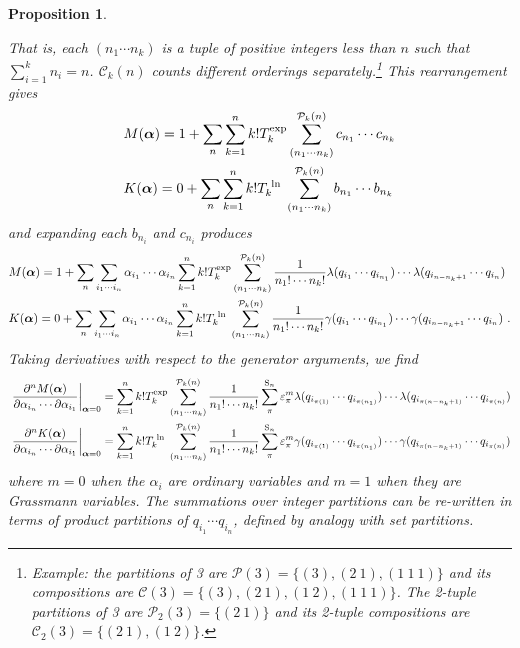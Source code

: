 \documentclass[11pt,fleqn]{article}
\renewcommand{\a}{\alpha}    %
\newcommand{\g}{\gamma}      %
\newcommand{\e}{\varepsilon} %
\newcommand{\la}{\lambda}    %
\newcommand{\cd}{\ensuremath{\cdots}}
\newcommand{\mc}[1]{\ensuremath{\mathcal{#1}}}
\newcommand{\mr}[1]{\ensuremath{\mathrm{#1}}}
\newcommand{\fr}[2]{\ensuremath{\dfrac{#1}{#2}}}
\newcommand{\pd}[2]{\ensuremath{\frac{\partial#1}{\partial#2}}}
\newcommand{\pt}{\ensuremath{\partial}}
\theoremstyle{mystyle}
\newtheorem{pro}{Proposition}[section]
\newcommand{\logbox}{\ensuremath{\text{\makebox[\widthof{exp}][c]{ln}}}}
\newcommand{\expbox}{\ensuremath{\text{\makebox[\widthof{exp}][c]{exp}}}}
\numberwithin{equation}{section}
\begin{document}
\begin{pro}
\begin{addmargin}[1em]{0em}
That is, each $(n_1\cd n_k)$ is a tuple of positive integers less than $n$ such that $\sum_{i=1}^k n_i=n$.  $\mc{C}_k(n)$ counts different orderings separately.\footnote{Example: the \textit{partitions} of 3 are $\mc{P}(3)=\{(3),(2\ 1),(1\ 1\ 1)\}$ and its \textit{compositions} are $\mc{C}(3)=\{(3),(2\ 1),(1\ 2),(1\ 1\ 1)\}$.
The \textit{2-tuple partitions} of 3 are $\mc{P}_2(3)=\{(2\ 1)\}$ and its \textit{2-tuple compositions} are $\mc{C}_2(3)=\{(2\ 1),(1\ 2)\}$.}
This rearrangement gives
\begin{align*}
&
  M(\bm\a)
=
  1
+
  \sum_n
  \sum_{k=1}^n
  k! T_k^{\expbox}
  \sum_{(n_1\cd n_k)}^{\mc{P}_k(n)}
  c_{n_1}\cd c_{n_k}
\\
&
  K(\bm\a)
=
  0
+
  \sum_n
  \sum_{k=1}^n
  k! T_k^{\logbox}
  \sum_{(n_1\cd n_k)}^{\mc{P}_k(n)}
  b_{n_1}\cd b_{n_k}
\end{align*}
and expanding each $b_{n_i}$ and $c_{n_i}$ produces
\begin{align*}
&
  M(\bm\a)
=
  1
+
  \sum_n
  \sum_{i_1\cd i_n}
  \a_{i_1}\cd \a_{i_n}
  \sum_{k=1}^n
  k! T_k^{\expbox}
  \sum_{(n_1\cd n_k)}^{\mc{P}_k(n)}
  \fr{1}{n_1!\cd n_k!}
  \la(q_{i_1}\cd q_{i_{n_1}})\cd\la(q_{i_{n-n_k+1}}\cd q_{i_n})
\\
&
  K(\bm\a)
=
  0
+
  \sum_n
  \sum_{i_1\cd i_n}
  \a_{i_1}\cd \a_{i_n}
  \sum_{k=1}^n
  k! T_k^{\logbox}
  \sum_{(n_1\cd n_k)}^{\mc{P}_k(n)}
  \fr{1}{n_1!\cd n_k!}
  \g(q_{i_1}\cd q_{i_{n_1}})\cd\g(q_{i_{n-n_k+1}}\cd q_{i_n})\ .
\end{align*}
Taking derivatives with respect to the generator arguments, we find
\begin{align*}
&
  \left.
  \pd{^n M(\bm\a)}{\a_{i_n}\cd\pt\a_{i_1}}
  \right|_{\bm\a=0}
=
  \sum_{k=1}^n
  k! T_k^{\expbox}
  \sum_{(n_1\cd n_k)}^{\mc{P}_k(n)}
  \fr{1}{n_1!\cd n_k!}
  \sum_{\pi}^{\mr{S}_n}
  \e_\pi^m
  \la(q_{i_{\pi(1)}}\cd q_{i_{\pi(n_1)}})\cd\la(q_{i_{\pi(n-n_k+1)}}\cd q_{i_{\pi(n)}})
\\
&
  \left.
  \pd{^n K(\bm\a)}{\a_{i_n}\cd\pt\a_{i_1}}
  \right|_{\bm\a=0}
=
  \sum_{k=1}^n
  k! T_k^{\logbox}
  \sum_{(n_1\cd n_k)}^{\mc{P}_k(n)}
  \fr{1}{n_1!\cd n_k!}
  \sum_{\pi}^{\mr{S}_n}
  \e_\pi^m
  \g(q_{i_{\pi(1)}}\cd q_{i_{\pi(n_1)}})\cd\g(q_{i_{\pi(n-n_k+1)}}\cd q_{i_{\pi(n)}})
\end{align*}
where $m=0$ when the $\a_i$ are ordinary variables and $m=1$ when they are Grassmann variables.
The summations over integer partitions can be re-written in terms of product partitions of $q_{i_1}\cd q_{i_n}$, defined by analogy with set partitions.

\end{addmargin}
\end{pro}
\end{document}

